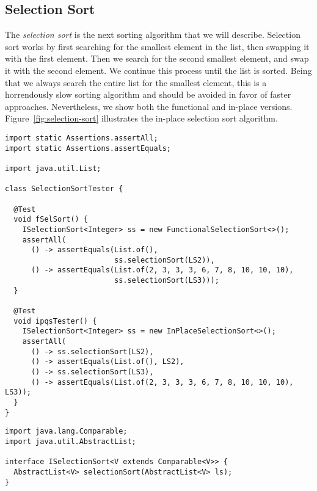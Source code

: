 \newpage
\subsection{Selection Sort}
The \emph{selection sort} is the next sorting algorithm that we will describe. 
Selection sort works by first searching for the smallest element in the list, then swapping it with the first element. 
Then we search for the second smallest element, and swap it with the second element. 
We continue this process until the list is sorted. 
Being that we always search the entire list for the smallest element, this is a horrendously slow sorting algorithm and should be avoided in favor of faster approaches. Nevertheless, we show both the functional and in-place versions. 
Figure~\ref{fig:selection-sort} illustrates the in-place selection sort algorithm. 

\begin{lstlisting}[language=MyJava]
import static Assertions.assertAll;
import static Assertions.assertEquals;

import java.util.List;

class SelectionSortTester {

  @Test
  void fSelSort() {
    ISelectionSort<Integer> ss = new FunctionalSelectionSort<>();
    assertAll(
      () -> assertEquals(List.of(), 
                         ss.selectionSort(LS2)),
      () -> assertEquals(List.of(2, 3, 3, 3, 6, 7, 8, 10, 10, 10), 
                         ss.selectionSort(LS3)));
  }

  @Test
  void ipqsTester() {
    ISelectionSort<Integer> ss = new InPlaceSelectionSort<>();
    assertAll(
      () -> ss.selectionSort(LS2),
      () -> assertEquals(List.of(), LS2),
      () -> ss.selectionSort(LS3),
      () -> assertEquals(List.of(2, 3, 3, 3, 6, 7, 8, 10, 10, 10), LS3));
  }
}
\end{lstlisting}

\begin{lstlisting}[language=MyJava]
import java.lang.Comparable;
import java.util.AbstractList;

interface ISelectionSort<V extends Comparable<V>> {
  AbstractList<V> selectionSort(AbstractList<V> ls);
}
\end{lstlisting}

\newpage
